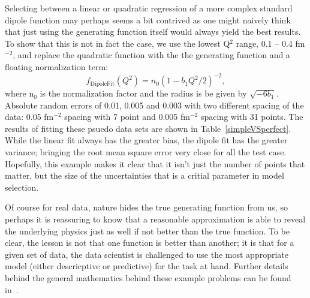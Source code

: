 \documentclass[10pt,aps,prc,twocolumn]{revtex4-1}
\begin{document}
Selecting between a linear or quadratic regression of a more complex standard dipole function may perhaps seems 
a bit contrived as one might naively think that just using the generating function itself would always yield the
best results.   To show that this is not in fact the case, 
we use the lowest Q$^2$ range, 0.1 -- 0.4 fm$^{-2}$, and replace the quadratic function 
with the the generating function and a floating normalization term:
\begin{equation}
\label{eq:fitdipole}
f_{{\mathrm{Dipole Fit}}}(Q^2) =  n_0 ( 1 - b_1 Q^2 / 2)^{-2},
\end{equation}
where n$_0$ is the normalization factor and the radius is be given by $\sqrt{-6 b_1}$.
Absolute random errors of 0.01, 0.005 and 0.003 with two different spacing of the data: 
0.05 fm$^{-2}$ spacing with 7 point and 0.005 fm$^{-2}$ 
spacing with 31 points.       
The results of fitting these psuedo data sets are shown in Table~\ref{simpleVSperfect}.    
While the linear fit always has the greater bias, the dipole fit has the greater 
variance; bringing the root mean square error very close for all the test case.   
Hopefully, this example makes it clear that it isn't just the number of points that matter, 
but the size of the uncertainties that is a critial parameter in model selection.

Of course for real data, nature hides the true generating function from us, so perhaps it is reassuring to know
that a reasonable approximation is able to reveal the underlying physics just as well if not better than the
true function.   
To be clear, the lesson is not that one function is better than another; it is that for a given set of data,
the data scientist is challenged to use the most appropriate model (either descricptive or predictive) for
the task at hand.   Further details behind the general mathematics behind these example problems can be 
found in~\cite{Shmueli:2010}.    
\end{document}
